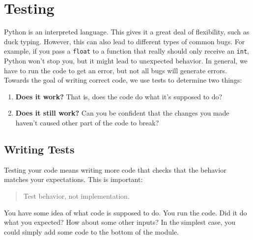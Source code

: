 \chapter{Testing}


Python is an interpreted language.  This gives it a great deal of flexibility, such as duck typing.  However, this can also lead to different types of common bugs.  For example, if you pass a \texttt{float} to a function that really should only receive  an \texttt{int}, Python won’t stop you, but it might lead to unexpected behavior.  In general, we have to run the code to get an error, but not all bugs will generate errors.  Towards the goal of writing correct code, we use tests to determine two things:

\begin{enumerate}

\item \textbf{Does it work?}  That is, does the code do what it’s supposed to do?

\item \textbf{Does it still work?} Can you be confident that the changes you made haven’t caused other part of the code to break?

\end{enumerate}
\section{Writing Tests}


Testing your code means writing more code that checks that the behavior matches your expectations. This is important:

\begin{quote}

Test  behavior, not implementation.

\end{quote}

You have some idea of what code is supposed to do.  You run the code.  Did it do what you expected?  How about some other inputs?  In the simplest case, you could simply add some code to the bottom of the module.  

